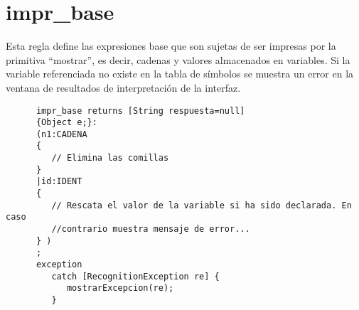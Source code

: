    \section{impr\_base}
   Esta regla define las expresiones base que son sujetas de ser impresas por la primitiva ``mostrar'', es decir, cadenas y valores
   almacenados en variables. Si la variable referenciada no existe en la tabla de símbolos se muestra un error en la ventana de 
   resultados de interpretación de la interfaz.
   \begin{lstlisting}
      impr_base returns [String respuesta=null]
      {Object e;}:
      (n1:CADENA 
      {
         // Elimina las comillas
      }
      |id:IDENT
      {
         // Rescata el valor de la variable si ha sido declarada. En caso 
         //contrario muestra mensaje de error...
      } )
      ;
      exception
         catch [RecognitionException re] {
            mostrarExcepcion(re);
         }
   \end{lstlisting}
